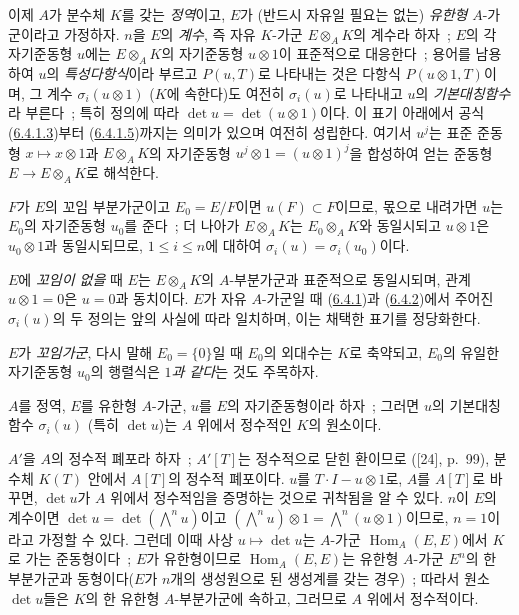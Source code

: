 \begin{env}[6.4.2]
\label{II.6.4.2-ko}
이제 $A$가 분수체 $K$를 갖는 \emph{정역}이고, $E$가 (반드시 자유일
필요는 없는) \emph{유한형} $A$-가군이라고 가정하자. $n$을 $E$의
\emph{계수}, 즉 자유 $K$-가군 $E\otimes_AK$의 계수라 하자~; $E$의
각 자기준동형 $u$에는 $E\otimes_AK$의 자기준동형 $u\otimes1$이
표준적으로 대응한다~; 용어를 남용하여 $u$의 \emph{특성다항식}이라
부르고 $P(u,T)$로 나타내는 것은 다항식 $P(u\otimes1,T)$이며, 그
계수 $\sigma_i(u\otimes1)$ ($K$에 속한다)도 여전히 $\sigma_i(u)$로
나타내고 $u$의 \emph{기본대칭함수}라 부른다~; 특히 정의에 따라
$\det u=\det(u\otimes1)$이다. 이 표기 아래에서 공식
(\hyperref[II.6.4.1.3-ko]{6.4.1.3})부터
(\hyperref[II.6.4.1.5-ko]{6.4.1.5})까지는 의미가 있으며 여전히
성립한다. 여기서 $u^j$는 표준 준동형 $x\mapsto x\otimes1$과
$E\otimes_AK$의 자기준동형
$u^j\otimes1=(u\otimes1)^j$을 합성하여 얻는 준동형
$E\to E\otimes_AK$로 해석한다.

$F$가 $E$의 꼬임 부분가군이고 $E_0=E/F$이면 $u(F)\subset F$이므로,
몫으로 내려가면 $u$는 $E_0$의 자기준동형 $u_0$를 준다~; 더 나아가
$E\otimes_AK$는 $E_0\otimes_AK$와 동일시되고 $u\otimes1$은
$u_0\otimes1$과 동일시되므로, $1\leq i\leq n$에 대하여
$\sigma_i(u)=\sigma_i(u_0)$이다.

$E$에 \emph{꼬임이 없을} 때 $E$는 $E\otimes_AK$의 $A$-부분가군과
표준적으로 동일시되며, 관계 $u\otimes1=0$은 $u=0$과 동치이다.
$E$가 자유 $A$-가군일 때
(\hyperref[II.6.4.1-ko]{6.4.1})과
(\hyperref[II.6.4.2-ko]{6.4.2})에서 주어진 $\sigma_i(u)$의 두 정의는
앞의 사실에 따라 일치하며, 이는 채택한 표기를 정당화한다.

$E$가 \emph{꼬임가군}, 다시 말해 $E_0=\{0\}$일 때 $E_0$의 외대수는
$K$로 축약되고, $E_0$의 유일한 자기준동형 $u_0$의 행렬식은
\emph{$1$과 같다}는 것도 주목하자.
\end{env}

\begin{proposition}[6.4.3]
\label{II.6.4.3-ko}
$A$를 정역, $E$를 유한형 $A$-가군, $u$를 $E$의 자기준동형이라 하자~;
그러면 $u$의 기본대칭함수 $\sigma_i(u)$ (특히 $\det u$)는 $A$ 위에서
정수적인 $K$의 원소이다.
\end{proposition}

$A'$을 $A$의 정수적 폐포라 하자~; $A'[T]$는 정수적으로 닫힌 환이므로
([24], p.~99), 분수체 $K(T)$ 안에서 $A[T]$의 정수적 폐포이다.
$u$를 $T\cdot I-u\otimes1$로, $A$를 $A[T]$로 바꾸면, $\det u$가
$A$ 위에서 정수적임을 증명하는 것으로 귀착됨을 알 수 있다. $n$이
$E$의 계수이면 $\det u=\det(\bigwedge^n u)$이고
$(\bigwedge^n u)\otimes1=\bigwedge^n(u\otimes1)$이므로, $n=1$이라고
가정할 수 있다. 그런데 이때 사상 $u\mapsto\det u$는 $A$-가군
$\operatorname{Hom}_A(E,E)$에서 $K$로 가는 준동형이다~; $E$가
유한형이므로 $\operatorname{Hom}_A(E,E)$는 유한형 $A$-가군 $E^n$의
한 부분가군과 동형이다($E$가 $n$개의 생성원으로 된 생성계를 갖는
경우)~; 따라서 원소 $\det u$들은 $K$의 한 유한형 $A$-부분가군에
속하고, 그러므로 $A$ 위에서 정수적이다.

